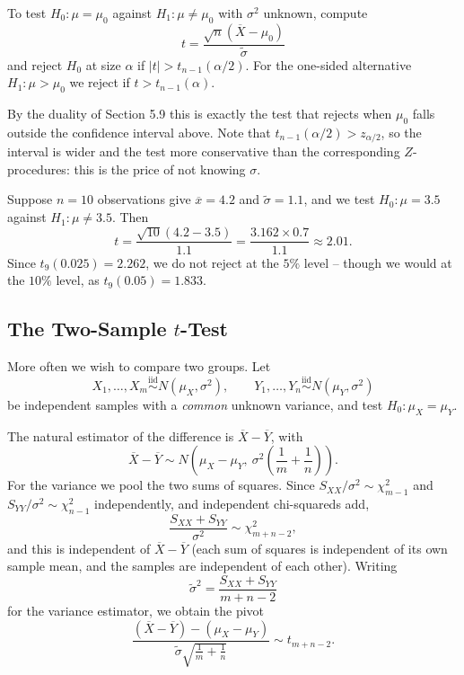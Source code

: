 \begin{definition}
  To test $H_0 : \mu = \mu_0$ against $H_1 : \mu \neq \mu_0$ with $\sigma^2$ unknown, compute
  $$
  t = \frac{\sqrt n\left(\overline{X}-\mu_0\right)}{\tilde\sigma}
  $$
  and reject $H_0$ at size $\alpha$ if $|t| > t_{n-1}(\alpha/2)$. For the one-sided alternative $H_1 : \mu > \mu_0$ we reject if $t > t_{n-1}(\alpha)$.
\end{definition}

By the duality of Section 5.9 this is exactly the test that rejects when $\mu_0$ falls outside the confidence interval above. Note that $t_{n-1}(\alpha/2) > z_{\alpha/2}$, so the interval is wider and the test more conservative than the corresponding $Z$-procedures: this is the price of not knowing $\sigma$.

\begin{example}
  Suppose $n = 10$ observations give $\overline{x} = 4.2$ and $\tilde\sigma = 1.1$, and we test $H_0: \mu = 3.5$ against $H_1 : \mu \neq 3.5$. Then
  $$
  t = \frac{\sqrt{10}(4.2 - 3.5)}{1.1} = \frac{3.162\times 0.7}{1.1} \approx 2.01.
  $$
  Since $t_9(0.025) = 2.262$, we do not reject at the $5\%$ level -- though we would at the $10\%$ level, as $t_9(0.05) = 1.833$.
\end{example}

\subsection{The Two-Sample \texorpdfstring{$t$}{t}-Test}

More often we wish to compare two groups. Let
$$
X_1,\dots,X_m \stackrel{\text{iid}}{\sim} N(\mu_X,\sigma^2), \qquad Y_1,\dots,Y_n \stackrel{\text{iid}}{\sim}N(\mu_Y,\sigma^2)
$$
be independent samples with a \emph{common} unknown variance, and test $H_0 : \mu_X = \mu_Y$.

The natural estimator of the difference is $\overline{X}-\overline{Y}$, with
$$
\overline{X}-\overline{Y}\sim N\left(\mu_X - \mu_Y,\ \sigma^2\left(\frac{1}{m}+\frac{1}{n}\right)\right).
$$
For the variance we pool the two sums of squares. Since $S_{XX}/\sigma^2 \sim \chi^2_{m-1}$ and $S_{YY}/\sigma^2\sim\chi^2_{n-1}$ independently, and independent chi-squareds add,
$$
\frac{S_{XX}+S_{YY}}{\sigma^2}\sim\chi^2_{m+n-2},
$$
and this is independent of $\overline{X}-\overline{Y}$ (each sum of squares is independent of its own sample mean, and the samples are independent of each other). Writing
$$
\tilde\sigma^2 = \frac{S_{XX}+S_{YY}}{m+n-2}
$$
for the  variance estimator, we obtain the pivot
$$
\frac{\left(\overline{X}-\overline{Y}\right) - (\mu_X-\mu_Y)}{\tilde\sigma\sqrt{\frac 1m + \frac 1n}} \sim t_{m+n-2}.
$$

